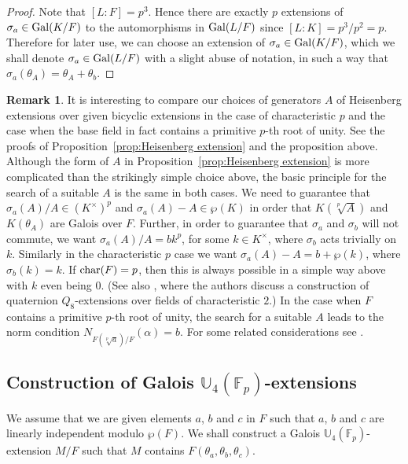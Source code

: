 \documentclass[12pt,leqno]{amsart}
\theoremstyle{plain}
\theoremstyle{definition}
\newtheorem{rmk}[thm]{Remark}
\newcommand{\F}{{\mathbb F}}
\newcommand{\U}{{\mathbb U}}
\begin{document}
\begin{proof}
Note that $[L:F]=p^3$. Hence there are exactly $p$ extensions of $\sigma_a\in {\rm Gal}(K/F)$ to the automorphisms in ${\rm Gal}(L/F)$ since $[L:K]=p^3/p^2=p$. Therefore for later use,  we can choose an extension of $\sigma_a\in {\rm Gal}(K/F)$, which we shall denote $\sigma_a\in {\rm Gal}(L/F)$ with a slight abuse of notation,  in such a way that $\sigma_a(\theta_{A})= \theta_{A}+ \theta_{b}$. 
\end{proof}
\begin{rmk} It is interesting to compare our choices of generators $A$ of Heisenberg extensions over given bicyclic extensions in the case of characteristic $p$ and the case when the base field in fact contains a primitive $p$-th root of unity.
 See the proofs of Proposition~\ref{prop:Heisenberg extension} and the proposition above. Although the form of $A$ in Proposition~\ref{prop:Heisenberg extension} is more complicated than the strikingly simple choice above, the basic principle for the search of a suitable $A$ is the same in both cases. We need to guarantee that $\sigma_a(A)/A\in (K^\times)^p$ and $\sigma_a(A)-A\in \wp(K)$  in order that $K(\sqrt[p]{A})$ and $K(\theta_A)$ are Galois over $F$.
 Further, in order to guarantee that $\sigma_a$ and $\sigma_b$ will not commute, we want  $\sigma_a(A)/A=bk^p$, for some $k\in K^\times$, where $\sigma_b$ acts trivially on $k$.
Similarly in the characteristic $p$ case we want $\sigma_a(A)-A=b+\wp(k)$, where $\sigma_b(k)=k$. If ${\rm char}(F)=p$, then this is always possible in a  simple way above with $k$ even being $0$. (See also \cite[Appendix A.1, Example]{JLY}, where the authors discuss a construction of quaternion $Q_8$-extensions over fields of characteristic $2$.)
In the case when $F$ contains a primitive $p$-th root of unity, the search for a suitable $A$ leads to the norm condition $N_{F(\sqrt[p]{a})/F}(\alpha)=b$. For some related considerations see \cite[Section 2]{MS1}.
\end{rmk}
\subsection{Construction of Galois $\U_4(\F_p)$-extensions}
We assume that we are given  elements $a$, $b$ and $c$ in $F$ such that 
 $a$, $b$ and $c$ are linearly independent modulo $\wp(F)$. We shall construct a Galois $\U_4(\F_p)$-extension $M/F$ such that $M$ contains $F(\theta_{a},\theta_{b},\theta_{c})$.
\end{document}
